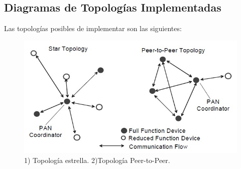 {    




%	
%
%	


\subsection{Diagramas de Topologías Implementadas}
\label{subsec:topo} 

Las topologías posibles de implementar son las siguientes:
\begin{figure}[h!]
	\centering
    \includegraphics[width=.8\textwidth]{./Figures/topologia.jpg}
    	\caption{1) Topología estrella. 2)Topología Peer-to-Peer.}
	\label{fig:topo}
\end{figure}

}

